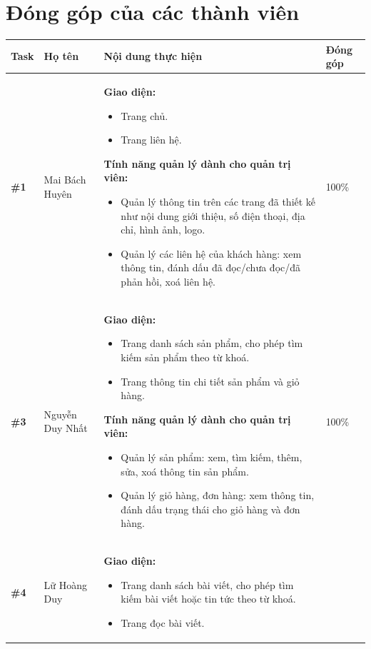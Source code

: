 \section*{\Large Đóng góp của các thành viên}
\label{sec:dong-gop-thanh-vien}

\begin{table}[H]
	\centering
	\begin{tabular}{|p{1cm}|p{3.5cm}|p{8.5cm}|p{2cm}|}
		\hline
		\textbf{Task} & \textbf{Họ tên} & \textbf{Nội dung thực hiện} & \textbf{Đóng góp} \\
		\hline
		
		\textbf{\#1} &
		Mai Bách Huyên &
		\textbf{Giao diện:}
		\begin{itemize}
			\item Trang chủ.
			\item Trang liên hệ.
		\end{itemize}
		
		\textbf{Tính năng quản lý dành cho quản trị viên:}
		\begin{itemize}
			\item Quản lý thông tin trên các trang đã thiết kế như nội dung giới thiệu, số điện thoại, địa chỉ, hình ảnh, logo.
			\item Quản lý các liên hệ của khách hàng: xem thông tin, đánh dấu đã đọc/chưa đọc/đã phản hồi, xoá liên hệ.
		\end{itemize}
		&
		100\% \\
		\hline
		
		\textbf{\#3} &
		Nguyễn Duy Nhất &
		\textbf{Giao diện:}
		\begin{itemize}
			\item Trang danh sách sản phẩm, cho phép tìm kiếm sản phẩm theo từ khoá.
			\item Trang thông tin chi tiết sản phẩm và giỏ hàng.
		\end{itemize}
		
		\textbf{Tính năng quản lý dành cho quản trị viên:}
		\begin{itemize}
			\item Quản lý sản phẩm: xem, tìm kiếm, thêm, sửa, xoá thông tin sản phẩm.
			\item Quản lý giỏ hàng, đơn hàng: xem thông tin, đánh dấu trạng thái cho giỏ hàng và đơn hàng.
		\end{itemize}
		&
		100\% \\
		\hline
		
		\textbf{\#4} &
		Lữ Hoàng Duy &
		\textbf{Giao diện:}
		\begin{itemize}
			\item Trang danh sách bài viết, cho phép tìm kiếm bài viết hoặc tin tức theo từ khoá.
			\item Trang đọc bài viết.
		\end{itemize}
		

\end{tabular}
\end{table}
